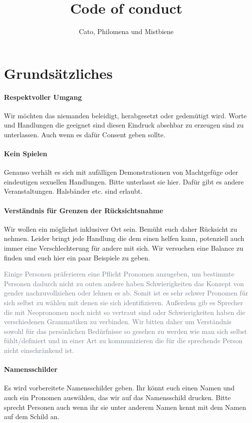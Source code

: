 \documentclass{article}
\title{Code of conduct}
\author{Cato, Philomena und Mistbiene}
\begin{document}
\section{Grundsätzliches}
\paragraph{\textcolor{PastelRed}{Respektvoller Umgang}}
Wir möchten das niemanden beleidigt, herabgesetzt oder gedemütigt wird. Worte und Handlungen die geeignet sind diesen Eindruck absehbar zu erzeugen sind zu unterlassen. Auch wenn es dafür Consent geben sollte. 
\paragraph{\textcolor{PastelRed}{Kein Spielen}}
Genauso verhält es sich mit aufälligen Demonstrationen von Machtgefüge oder eindeutigen sexuellen Handlungen. Bitte unterlasst sie hier. Dafür gibt es andere Veranstaltungen. Halsbänder etc. sind erlaubt.
\paragraph{\textcolor{PastelRed}{Verständnis für Grenzen der Rücksichtsnahme}}
Wir wollen ein möglichst inklusiver Ort sein. Bemüht euch daher Rücksicht zu nehmen. Leider bringt jede Handlung die dem einen helfen kann, potenziell auch immer eine Verschlechterung für andere mit sich. Wir versuchen eine Balance zu finden und euch hier ein paar Beispiele zu geben.

\begingroup{}
\textcolor{SlateGrey}{Einige Personen präferieren eine Pflicht Pronomen anzugeben, um bestimmte Personen dadurch nicht zu outen andere haben Schwierigkeiten das Konzept von gender nachzuvollziehen oder lehnen es ab. Somit ist es sehr schwer Pronomen für sich selbst zu wählen mit denen sie sich identifizieren. Außerdem gib es Sprecher die mit Neopronomen noch nicht so vertraut sind oder Schwierigkeiten haben die verschiedenen Grammatiken zu verbinden. Wir bitten daher um Verständnis sowohl für das persönlichen Bedürfnisse so gesehen zu werden wie man sich selbst fühlt/definiert und in einer Art zu kommunizieren die für die sprechende Person nicht einschränkend ist.}

\endgroup
\paragraph{\textcolor{PastelRed}{Namensschilder}}
Es wird vorbereitete Namensschilder geben. Ihr könnt euch einen Namen und auch ein Pronomen auswählen, das wir auf das Namensschild drucken. Bitte sprecht Personen auch wenn ihr sie unter anderem Namen kennt mit dem Namen auf dem Schild an.
\end{document}
